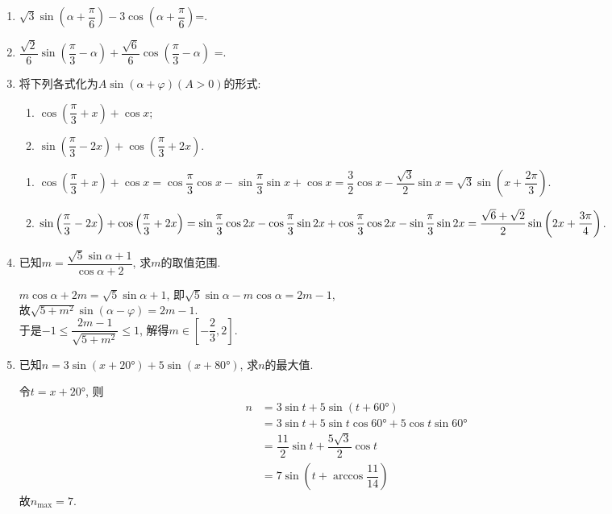 \begin{enumerate}
    \item $\sqrt{3}\sin\left(\alpha+\dfrac{\pi}{6}\right)-3\cos\left(\alpha+\dfrac{\pi}{6}\right)$=. 

    \item $\dfrac{\sqrt{2}}{6}\sin\left(\dfrac{\pi}{3}-\alpha\right)+\dfrac{\sqrt{6}}{6}\cos\left(\dfrac{\pi}{3}-\alpha\right)$
    =. 
    \item 将下列各式化为$A\sin\left(\alpha+\varphi\right)\left(A>0\right)$的形式: 
    \begin{enumerate}[(1)]
    \item $\cos\left(\dfrac{\pi}{3}+x\right)+\cos{x}$; 
    
    \item $\sin\left(\dfrac{\pi}{3}-2x\right)+\cos\left(\dfrac{\pi}{3}+2x\right)$. 
    \end{enumerate}
    \begin{jieda}
    \begin{enumerate}[(1)]
    \item $\cos\left(\dfrac{\pi}{3}+x\right)+\cos{x}=\cos\dfrac{\pi}{3}\cos{x}-\sin\dfrac{\pi}{3}\sin{x}+\cos{x}=\dfrac{3}{2}\cos{x}-\dfrac{\sqrt{3}}{2}\sin{x}=\sqrt{3}\sin\left(x+\dfrac{2\pi}{3}\right)$. 
    
    \item $\sin\left(\dfrac{\pi}{3}-2x\right)+\cos\left(\dfrac{\pi}{3}+2x\right)=\sin\dfrac{\pi}{3}\cos2x-\cos\dfrac{\pi}{3}\sin2x+\cos\dfrac{\pi}{3}\cos2x-\sin\dfrac{\pi}{3}\sin2x\\
    =\dfrac{\sqrt{6}+\sqrt{2}}{2}\sin\left(2x+\dfrac{3\pi}{4}\right)$. 
    \end{enumerate}
    \end{jieda}
    
    \item 已知$m=\dfrac{\sqrt{5}\sin\alpha+1}{\cos\alpha+2}$, 求$m$的取值范围. 
    \begin{jieda}
    $m\cos\alpha+2m=\sqrt{5}\sin\alpha+1$, 即$\sqrt{5}\sin\alpha-m\cos\alpha=2m-1$, \\
    故$\sqrt{5+m^2}\sin\left(\alpha-\varphi\right)=2m-1$. \\
    于是$-1\leq \dfrac{2m-1}{\sqrt{5+m^2}}\leq 1$, 解得$m\in\left[-\dfrac{2}{3},2\right]$. 
    \end{jieda}
    
    \item 已知$n=3\sin\left(x+\ang{20}\right)+5\sin\left(x+\ang{80}\right)$, 求$n$的最大值. 
    \begin{jieda}
    令$t=x+\ang{20}$, 则
    \begin{align*}
    n & =3\sin{t}+5\sin\left(t+\ang{60}\right)\\
    & = 3\sin{t}+5\sin{t}\cos\ang{60}+5\cos{t}\sin\ang{60}\\
    & = \dfrac{11}{2}\sin{t}+\dfrac{5\sqrt{3}}{2}\cos{t}\\
    & = 7\sin\left(t+\arccos\dfrac{11}{14}\right)
    \end{align*}
    故$n_{\max}=7$. 
    \end{jieda}
    

\end{enumerate}
